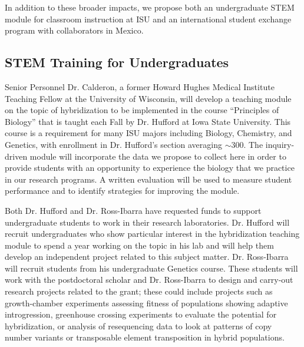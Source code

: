 In addition to these broader impacts, we propose both an undergraduate STEM module for classroom instruction at ISU and an international student exchange program with collaborators in Mexico.

\subsection*{STEM Training for Undergraduates}
Senior Personnel Dr. Calderon, a former Howard Hughes Medical Institute Teaching Fellow at the University of Wisconsin, will develop a teaching module on the topic of hybridization to be implemented in the course ``Principles of Biology'' that is taught each Fall by Dr. Hufford at Iowa State University.
This course is a requirement for many ISU majors including Biology, Chemistry, and Genetics, with enrollment in Dr. Hufford's section averaging $\sim$300.
The inquiry-driven module will incorporate the data we propose to collect here in order to provide students with an opportunity to experience the biology that we practice in our research programs.
A written evaluation will be used to measure student performance and to identify strategies for improving the module.

Both Dr. Hufford and Dr. Ross-Ibarra have requested funds to support undergraduate students to work in their research laboratories.
Dr. Hufford will recruit undergraduates who show particular interest in the hybridization teaching module to spend a year working on the topic in his lab and will help them develop an independent project related to this subject matter.
Dr. Ross-Ibarra will recruit students from his undergraduate Genetics course.  These students will work with the postdoctoral scholar and Dr. Ross-Ibarra to design and carry-out research projects related to the grant; these could include projects such as growth-chamber experiments assessing fitness of populations showing adaptive introgression, greenhouse crossing experiments to evaluate the potential for hybridization, or analysis of resequencing data to look at patterns of copy number variants or transposable element transposition in hybrid populations.

